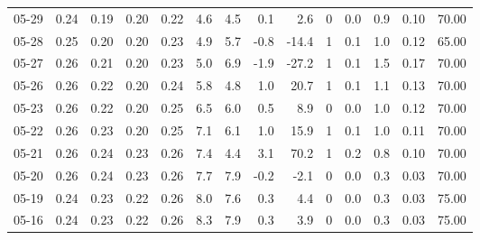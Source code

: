 \begin{threeparttable}
{\begin{tabular}{lrrrrrrrrrrrrr}
  05-29 &          0.24 &          0.19 &          0.20 &        0.22 &                 4.6 &                 4.5 &        0.1 &          2.6 &              0 &                 0.0 &              0.9 &            0.10 &                  70.00 \\
  05-28 &          0.25 &          0.20 &          0.20 &        0.23 &                 4.9 &                 5.7 &       -0.8 &        -14.4 &              1 &                 0.1 &              1.0 &            0.12 &                  65.00 \\
  05-27 &          0.26 &          0.21 &          0.20 &        0.23 &                 5.0 &                 6.9 &       -1.9 &        -27.2 &              1 &                 0.1 &              1.5 &            0.17 &                  70.00 \\
  05-26 &          0.26 &          0.22 &          0.20 &        0.24 &                 5.8 &                 4.8 &        1.0 &         20.7 &              1 &                 0.1 &              1.1 &            0.13 &                  70.00 \\
  05-23 &          0.26 &          0.22 &          0.20 &        0.25 &                 6.5 &                 6.0 &        0.5 &          8.9 &              0 &                 0.0 &              1.0 &            0.12 &                  70.00 \\
  05-22 &          0.26 &          0.23 &          0.20 &        0.25 &                 7.1 &                 6.1 &        1.0 &         15.9 &              1 &                 0.1 &              1.0 &            0.11 &                  70.00 \\
  05-21 &          0.26 &          0.24 &          0.23 &        0.26 &                 7.4 &                 4.4 &        3.1 &         70.2 &              1 &                 0.2 &              0.8 &            0.10 &                  70.00 \\
  05-20 &          0.26 &          0.24 &          0.23 &        0.26 &                 7.7 &                 7.9 &       -0.2 &         -2.1 &              0 &                 0.0 &              0.3 &            0.03 &                  70.00 \\
  05-19 &          0.24 &          0.23 &          0.22 &        0.26 &                 8.0 &                 7.6 &        0.3 &          4.4 &              0 &                 0.0 &              0.3 &            0.03 &                  75.00 \\
  05-16 &          0.24 &          0.23 &          0.22 &        0.26 &                 8.3 &                 7.9 &        0.3 &          3.9 &              0 &                 0.0 &              0.3 &            0.03 &                  75.00 \\

\end{tabular}}
\end{threeparttable}
